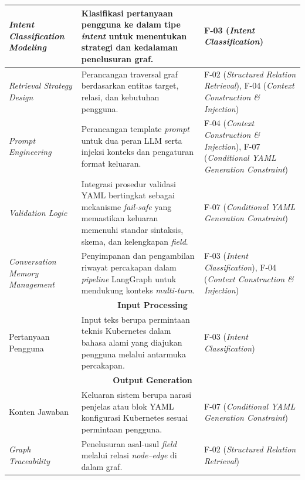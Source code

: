 \begin{longtable}{ p{3.8cm} p{5cm} p{4cm} }
\textit{Intent Classification Modeling} &
Klasifikasi pertanyaan pengguna ke dalam tipe \textit{intent} untuk menentukan strategi dan kedalaman penelusuran graf. &
F-03 (\textit{Intent Classification}) \\ \hline

\textit{Retrieval Strategy Design} &
Perancangan traversal graf berdasarkan entitas target, relasi, dan kebutuhan pengguna. &
F-02 (\textit{Structured Relation Retrieval}),
F-04 (\textit{Context Construction \& Injection}) \\ \hline

\textit{Prompt Engineering} &
Perancangan template \textit{prompt} untuk dua peran LLM serta injeksi konteks dan pengaturan format keluaran. &
F-04 (\textit{Context Construction \& Injection}),
F-07 (\textit{Conditional YAML Generation Constraint}) \\ \hline

\textit{Validation Logic} &
Integrasi prosedur validasi YAML bertingkat sebagai mekanisme \textit{fail-safe} yang memastikan keluaran memenuhi standar sintaksis, skema, dan kelengkapan \textit{field}. &
F-07 (\textit{Conditional YAML Generation Constraint}) \\ \hline

\textit{Conversation Memory Management} &
Penyimpanan dan pengambilan riwayat percakapan dalam \textit{pipeline} LangGraph untuk mendukung konteks \textit{multi-turn}. &
F-03 (\textit{Intent Classification}),
F-04 (\textit{Context Construction \& Injection}) \\ \hline


\multicolumn{3}{c}{\textbf{Input Processing}} \\ \hline

Pertanyaan Pengguna &
Input teks berupa permintaan teknis Kubernetes dalam bahasa alami yang diajukan pengguna melalui antarmuka percakapan. &
F-03 (\textit{Intent Classification}) \\ \hline


\multicolumn{3}{c}{\textbf{Output Generation}} \\ \hline

Konten Jawaban &
Keluaran sistem berupa narasi penjelas atau blok YAML konfigurasi Kubernetes sesuai permintaan pengguna. &
F-07 (\textit{Conditional YAML Generation Constraint}) \\ \hline

\textit{Graph Traceability} &
Penelusuran asal-usul \textit{field} melalui relasi \textit{node–edge} di dalam graf. &
F-02 (\textit{Structured Relation Retrieval}) \\ \hline



\end{longtable}
